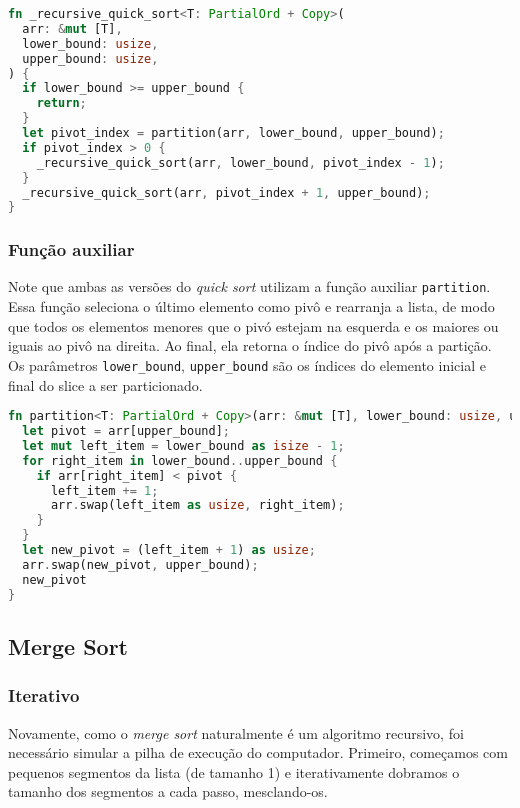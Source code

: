 \newpage

\begin{lstlisting}[language=Rust, caption={Versão correta}]
fn _recursive_quick_sort<T: PartialOrd + Copy>(
  arr: &mut [T],
  lower_bound: usize,
  upper_bound: usize,
) {
  if lower_bound >= upper_bound {
    return;
  }
  let pivot_index = partition(arr, lower_bound, upper_bound);
  if pivot_index > 0 {
    _recursive_quick_sort(arr, lower_bound, pivot_index - 1);
  }
  _recursive_quick_sort(arr, pivot_index + 1, upper_bound);
}
\end{lstlisting}
\FloatBarrier

\subsubsection{Função auxiliar}

Note que ambas as versões do \textit{quick sort} utilizam a função auxiliar \texttt{partition}. Essa função seleciona o último elemento como pivô e rearranja a lista, de modo que todos os elementos menores que o pivó estejam na esquerda e os maiores ou iguais ao pivô na direita. Ao final, ela retorna o índice do pivô após a partição.
Os parâmetros \texttt{lower\_bound}, \texttt{upper\_bound} são os índices do elemento inicial e final do slice a ser particionado.

\begin{lstlisting}[language=Rust]
fn partition<T: PartialOrd + Copy>(arr: &mut [T], lower_bound: usize, upper_bound: usize) -> usize {
  let pivot = arr[upper_bound];
  let mut left_item = lower_bound as isize - 1;
  for right_item in lower_bound..upper_bound {
    if arr[right_item] < pivot {
      left_item += 1;
      arr.swap(left_item as usize, right_item);
    }
  }
  let new_pivot = (left_item + 1) as usize;
  arr.swap(new_pivot, upper_bound);
  new_pivot
}
\end{lstlisting}
\FloatBarrier

\subsection{Merge Sort}

\subsubsection{Iterativo}

Novamente, como o \textit{merge sort} naturalmente é um algoritmo recursivo, foi necessário simular a pilha de execução do computador. Primeiro, começamos com pequenos segmentos da lista (de tamanho 1) e iterativamente dobramos o tamanho dos segmentos a cada passo, mesclando-os.

